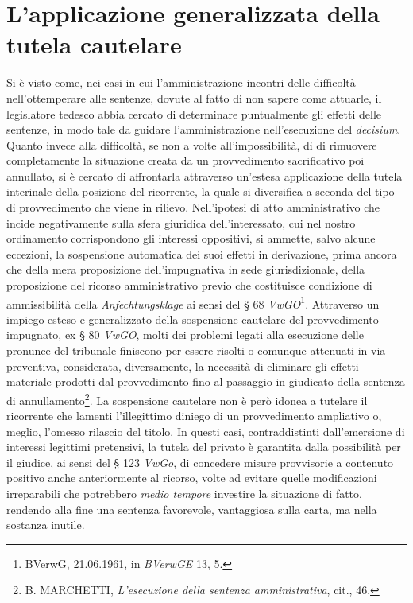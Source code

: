 \documentclass[12pt,it,a4paper,]{report}
\begin{document}
\hypertarget{lapplicazione-generalizzata-della-tutela-cautelare}{%
\section{L'applicazione generalizzata della tutela
cautelare}\label{lapplicazione-generalizzata-della-tutela-cautelare}}

Si è visto come, nei casi in cui l'amministrazione incontri delle
difficoltà nell'ottemperare alle sentenze, dovute al fatto di non sapere
come attuarle, il legislatore tedesco abbia cercato di determinare
puntualmente gli effetti delle sentenze, in modo tale da guidare
l'amministrazione nell'esecuzione del \emph{decisium}. Quanto invece
alla difficoltà, se non a volte all'impossibilità, di di rimuovere
completamente la situazione creata da un provvedimento sacrificativo poi
annullato, si è cercato di affrontarla attraverso un'estesa applicazione
della tutela interinale della posizione del ricorrente, la quale si
diversifica a seconda del tipo di provvedimento che viene in rilievo.
Nell'ipotesi di atto amministrativo che incide negativamente sulla sfera
giuridica dell'interessato, cui nel nostro ordinamento corrispondono gli
interessi oppositivi, si ammette, salvo alcune eccezioni, la sospensione
automatica dei suoi effetti in derivazione, prima ancora che della mera
proposizione dell'impugnativa in sede giurisdizionale, della
proposizione del ricorso amministrativo previo che costituisce
condizione di ammissibilità della \emph{Anfechtungsklage} ai sensi del §
68 \emph{VwGO}\footnote{BVerwG, 21.06.1961, in \emph{BVerwGE} 13, 5.}.
Attraverso un impiego esteso e generalizzato della sospensione cautelare
del provvedimento impugnato, ex § 80 \emph{VwGO}, molti dei problemi
legati alla esecuzione delle pronunce del tribunale finiscono per essere
risolti o comunque attenuati in via preventiva, considerata,
diversamente, la necessità di eliminare gli effetti materiale prodotti
dal provvedimento fino al passaggio in giudicato della sentenza di
annullamento\footnote{B. MARCHETTI, \emph{L'esecuzione della sentenza
  amministrativa}, cit., 46.}. La sospensione cautelare non è però
idonea a tutelare il ricorrente che lamenti l'illegittimo diniego di un
provvedimento ampliativo o, meglio, l'omesso rilascio del titolo. In
questi casi, contraddistinti dall'emersione di interessi legittimi
pretensivi, la tutela del privato è garantita dalla possibilità per il
giudice, ai sensi del § 123 \emph{VwGo}, di concedere misure provvisorie
a contenuto positivo anche anteriormente al ricorso, volte ad evitare
quelle modificazioni irreparabili che potrebbero \emph{medio tempore}
investire la situazione di fatto, rendendo alla fine una sentenza
favorevole, vantaggiosa sulla carta, ma nella sostanza inutile.
\end{document}
